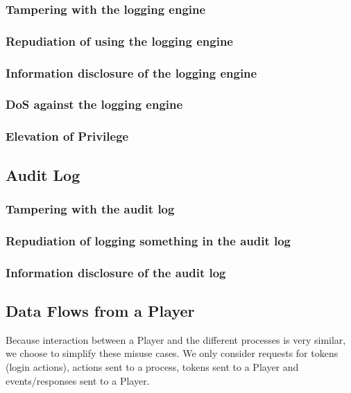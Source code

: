 \documentclass[a4paper,11pt]{report}
\begin{document}
\subsubsection{Tampering with the logging engine}
\subsubsection{Repudiation of using the logging engine}
\subsubsection{Information disclosure of the logging engine}
\subsubsection{DoS against the logging engine}
\subsubsection{Elevation of Privilege}
\subsection{Audit Log}
\subsubsection{Tampering with the audit log}
\subsubsection{Repudiation of logging something in the audit log}
\subsubsection{Information disclosure of the audit log}

\subsection{Data Flows from a Player}

Because interaction between a Player and the different processes is very similar, we choose to simplify these misuse cases. We only consider requests for tokens (login actions), actions sent to a process, tokens sent to a Player and events/responses sent to a Player.
\end{document}
